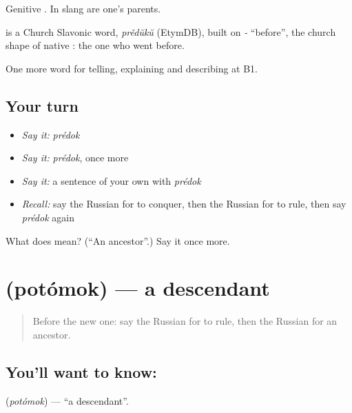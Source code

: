 Genitive \emph{}. In slang \emph{} are one's parents.

\begin{cousinweb}
\emph{} is a Church Slavonic word, \emph{prědŭkŭ} (EtymDB), built on \emph{-} \textquotedblleft{}before\textquotedblright{}, the church shape of native \emph{}: the one who went before.
\end{cousinweb}

\begin{grammarlens}[title={What you've built}]
One more word for telling, explaining and describing at B1.
\end{grammarlens}

\subsection*{Your turn}
\begin{itemize}
\raggedright
  \item \emph{Say it:} \emph{prédok}
  \item \emph{Say it:} \emph{prédok}, once more
  \item \emph{Say it:} a sentence of your own with \emph{prédok}
  \item \emph{Recall:} say the Russian for to conquer, then the Russian for to rule, then say \emph{prédok} again
\end{itemize}

\begin{tcolorbox}[breakable,colback=teal!4,colframe=teal!35!black,title={Before you move on}]
What does  mean? (\textquotedblleft{}An ancestor\textquotedblright{}.) Say it once more.
\end{tcolorbox}
\section[\texorpdfstring{\ru{потомок} (potómok)}{потомок (potómok)}]{ (potómok) — a descendant}

\label{lesson:RU-C326-potomok}



\begin{quote}
Before the new one: say the Russian for to rule, then the Russian for an ancestor.
\end{quote}

\subsection*{You'll want to know: }
\textbf{} (\emph{potómok}) — \textquotedblleft{}a descendant\textquotedblright{}.

